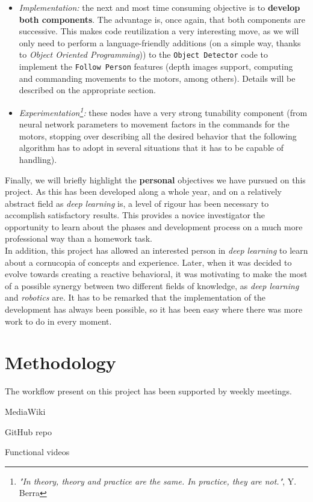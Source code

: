 \begin{itemize}
	\item \textit{Implementation:} the next and most time consuming objective is to \textbf{develop both components}. The advantage is, once again, that both components are successive. This makes code reutilization a very interesting move, as we will only need to perform a language-friendly additions (on a simple way, thanks to \textit{Object Oriented Programming})) to the \texttt{Object Detector} code to implement the \texttt{Follow Person} features (depth images support, computing and commanding movements to the motors, among others). Details will be described on the appropriate section.
	
	\item \textit{Experimentation\footnote{\textit{"In theory, theory and practice are the same. In practice, they are not."}, Y. Berra}:} these nodes have a very strong tunability component (from neural network parameters to movement factors in the commands for the motors, stopping over describing all the desired behavior that the following algorithm has to adopt in several situations that it has to be capable of handling).
	
\end{itemize}

Finally, we will briefly highlight the \textbf{personal} objectives we have pursued on this project. As this has been developed along a whole year, and on a relatively abstract field as \emph{deep learning} is, a level of rigour has been necessary to accomplish satisfactory results. This provides a novice investigator the opportunity to learn about the phases and development process on a much more professional way than a homework task. \\

In addition, this project has allowed an interested person in \emph{deep learning} to learn about a cornucopia of concepts and experience. Later, when it was decided to evolve towards creating a reactive behavioral, it was motivating to make the most of a possible synergy between two different fields of knowledge, as \emph{deep learning} and \emph{robotics} are. It has to be remarked that the implementation of the development has always been possible, so it has been easy where there was more work to do in every moment.

\section{Methodology}
The workflow present on this project has been supported by weekly meetings.

MediaWiki

GitHub repo

Functional videos

